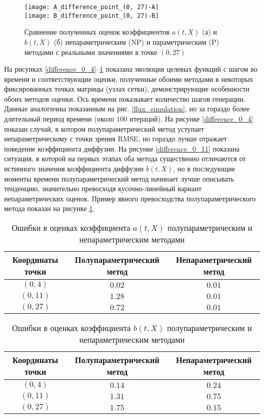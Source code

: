 \begin{figure}[!h]
	\centering
	\texttt{[image: A\_difference\_point\_(0, 27)-A]}\\
	\texttt{[image: B\_difference\_point\_(0, 27)-B]}\\
	\caption{Сравнение полученных оценок коэффициентов $a(t,X)$ (а) и $b(t,X)$ (б) непараметрическим (NP) и параметрическим (P) методами с реальными значениями в точке $(0,27)$}
	\label{difference_0_27}
\end{figure}

На рисунках \ref{difference_0_4}--\ref{difference_0_27} показана эволюция целевых функций с шагом во времени и соответствующие оценки, полученные обоими методами в некоторых фиксированных точках матрицы (узлах сетки), демонстрирующие особенности обоих методов оценки. Ось времени показывает количество шагов генерации. Данные аналогичны показанным на рис. \ref{flux_simulation}, но за гораздо более длительный период времени (около $100$ итераций).
На рисунке \ref{difference_0_4} показан случай, в котором полупараметрический метод уступает непараметрическому с точки зрения RMSE, но гораздо лучше отражает поведение коэффициента диффузии. На рисунке \ref{difference_0_11} показана ситуация, в которой на первых этапах оба метода существенно отличаются от истинного значения коэффициента диффузии $b(t,X)$, но в последующие моменты времени полупараметрический метод начинает лучше описывать тенденцию, значительно превосходя кусочно-линейный вариант непараметрических оценок. Пример явного превосходства полупараметрического метода показан на рисунке \ref{difference_0_27}.

\begin{table}[h!]
	\centering
	\caption{Ошибки в оценках коэффициента $a(t,X)$ полупараметрическим и непараметрическим методами}
	\begin{tabular}{|c|c|c|}
		\hline
		Координаты точки & Полупараметрический метод & Непараметрический метод \\
		\hline
		$(0, 4)$ & $0.02$ & $0.01$ \\
		$(0, 11)$ & $1.28$ & $0.01$ \\
		$(0, 27)$ & $0.72$ & $0.01$ \\
		\hline
	\end{tabular}
	\label{table_errors_estimation_a}
\end{table}

\begin{table}[h!]
	\centering
	\caption{Ошибки в оценках коэффициента $b(t,X)$ полупараметрическим и непараметрическим методами}
	\begin{tabular}{|c|c|c|}
		\hline
		Координаты точки & Полупараметрический метод & Непараметрический метод \\
		\hline
		$(0, 4)$ & $0.14$ & $0.24$ \\
		$(0, 11)$ & $1.31$ & $0.75$ \\
		$(0, 27)$ & $1.75$ & $0.15$ \\
		\hline
	\end{tabular}
	\label{table_errors_estimation_b}
\end{table}

